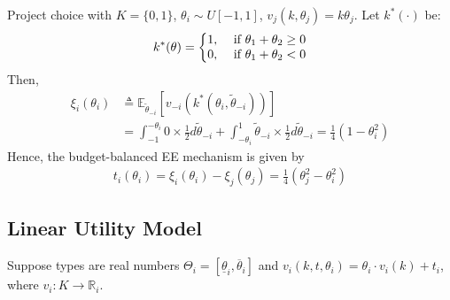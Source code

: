 \documentclass[11pt]{elegantbook}
\begin{document}
\begin{example}
    Project choice with $K=\{0,1\}$, $\theta_i\sim U[-1,1]$, $v_j(k,\theta_j)=k\theta_j$. Let $k^*(\cdot)$ be:
    \begin{equation}
        \begin{aligned}
            k^*(\theta)=\left\{\begin{matrix}
                1,&\textnormal{ if }\theta_1+\theta_2\geq 0\\
                0,&\textnormal{ if }\theta_1+\theta_2<0
            \end{matrix}\right.
        \end{aligned}
        \nonumber
    \end{equation}
    Then,
    \begin{equation}
        \begin{aligned}
            \xi_i(\theta_i)&\triangleq\mathbb{E}_{\tilde{\theta}_{-i}}\left[v_{-i}(k^*(\theta_i,\tilde{\theta}_{-i}))\right]\\
            &=\int_{-1}^{-\theta_i}0\times \frac{1}{2} d\tilde{\theta}_{-i}+\int_{-\theta_i}^1 \tilde{\theta}_{-i}\times \frac{1}{2} d\tilde{\theta}_{-i}=\frac{1}{4}(1-\theta_i^2)
        \end{aligned}
        \nonumber
    \end{equation}
    Hence, the budget-balanced EE mechanism is given by
    \begin{equation}
        \begin{aligned}
            t_i(\theta_i)=\xi_i(\theta_i)-\xi_j(\theta_j)=\frac{1}{4}(\theta_j^2-\theta_i^2)
        \end{aligned}
        \nonumber
    \end{equation}
\end{example}

\subsection{Linear Utility Model}
Suppose types are real numbers $\Theta_i=[\underline{\theta}_i,\overline{\theta}_i]$ and $v_i(k,t,\theta_i)=\theta_i\cdot v_i(k)+t_i$, where $v_i:K \rightarrow \mathbb{R}_i$.
\end{document}
